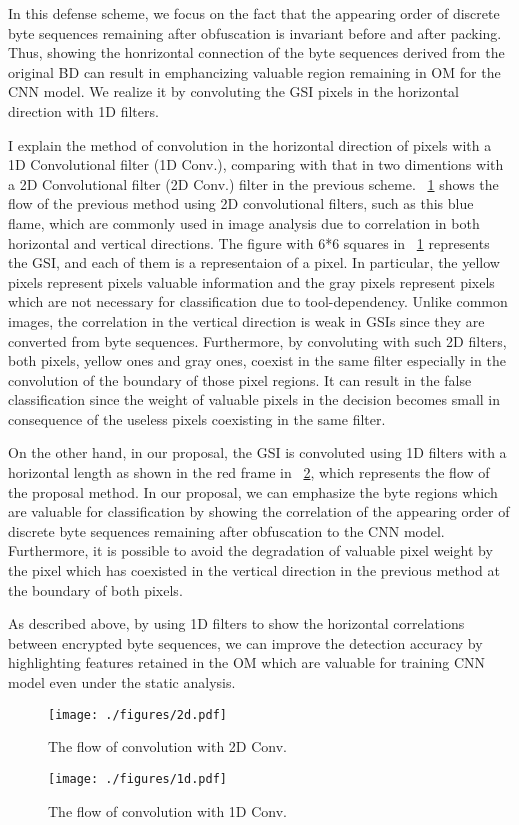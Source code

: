 In this defense scheme, we focus on the fact that the appearing order of discrete byte sequences remaining after obfuscation is invariant before and after packing.
Thus, showing the honrizontal connection of the byte sequences derived from the original BD can result in emphancizing valuable region remaining in OM for the CNN model.
We realize it by convoluting the GSI pixels in the horizontal direction with 1D filters.

I explain the method of convolution in the horizontal direction of pixels with a 1D Convolutional filter (1D Conv.), comparing with that in two dimentions with a 2D Convolutional filter (2D Conv.) filter in the previous scheme.
\figurename~\ref{fig:2d} shows the flow of the previous method using 2D convolutional filters, such as this blue flame, which are commonly used in image analysis due to correlation in both horizontal and vertical directions.
The figure with 6*6 squares in \figurename~\ref{fig:2d} represents the GSI, and each of them is a representaion of a pixel.
In particular, the yellow pixels represent pixels valuable information and the gray pixels represent pixels which are not necessary for classification due to tool-dependency.
Unlike common images, the correlation in the vertical direction is weak in GSIs since they are converted from byte sequences.
Furthermore, by convoluting with such 2D filters, both pixels, yellow ones and gray ones, coexist in the same filter especially in the convolution of the boundary of those pixel regions.
It can result in the false classification since the weight of valuable pixels in the decision becomes small in consequence of the useless pixels coexisting in the same filter.

On the other hand, in our proposal, the GSI is convoluted using 1D filters with a horizontal length as shown in the red frame in \figurename~\ref{fig:1d}, which represents the flow of the proposal method.
In our proposal, we can emphasize the byte regions which are valuable for classification by showing the correlation of the appearing order of discrete byte sequences remaining after obfuscation to the CNN model.
Furthermore, it is possible to avoid the degradation of valuable pixel weight by the pixel which has coexisted in the vertical direction in the previous method at the boundary of both pixels.

As described above, by using 1D filters to show the horizontal correlations between encrypted byte sequences, we can improve the detection accuracy by highlighting features retained in the OM which are valuable for training CNN model even under the static analysis.

\begin{figure}[p]
 \centering
 \hspace{-55pt}
 \texttt{[image: ./figures/2d.pdf]}
 \caption{The flow of convolution with 2D Conv.} 
 \label{fig:2d}
\end{figure}
\begin{figure}[p]
 \centering
 \hspace{-55pt}
 \texttt{[image: ./figures/1d.pdf]}
 \caption{The flow of convolution with 1D Conv.} 
 \label{fig:1d}
\end{figure}
\afterpage{\clearpage}
\newpage


